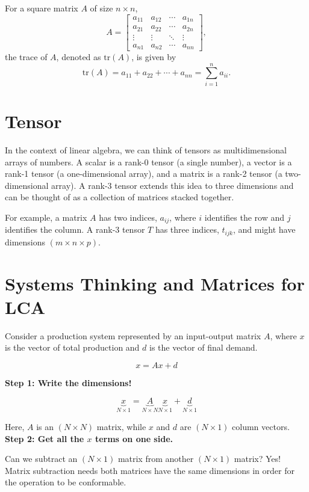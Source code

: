 \documentclass[12pt]{article}
\begin{document}
For a square matrix \( A \) of size \( n \times n \),
\[
A = \begin{bmatrix} a_{11} & a_{12} & \cdots & a_{1n} \\ a_{21} & a_{22} & \cdots & a_{2n} \\ \vdots & \vdots & \ddots & \vdots \\ a_{n1} & a_{n2} & \cdots & a_{nn} \end{bmatrix},
\]
the trace of \( A \), denoted as \( \text{tr}(A) \), is given by
\[
\text{tr}(A) = a_{11} + a_{22} + \cdots + a_{nn} = \sum_{i=1}^n a_{ii}.
\]

\section{Tensor}
In the context of linear algebra, we can think of tensors as multidimensional arrays of numbers. A scalar is a rank-0 tensor (a single number), a vector is a rank-1 tensor (a one-dimensional array), and a matrix is a rank-2 tensor (a two-dimensional array). A rank-3 tensor extends this idea to three dimensions and can be thought of as a collection of matrices stacked together.

For example, a matrix $A$ has two indices, $a_{ij}$, where $i$ identifies the row and $j$ identifies the column. A rank-3 tensor $T$ has three indices, $t_{ijk}$, and might have dimensions $(m \times n \times p)$.

\section{Systems Thinking and Matrices for LCA}

Consider a production system represented by an input-output matrix $A$, where $x$ is the vector of total production and $d$ is the vector of final demand.

\[
x = Ax + d
\]

\textbf{Step 1: Write the dimensions!}

\[
\underbrace{x}_{N \times 1}
=
\underbrace{A}_{N \times N}
\underbrace{x}_{N \times 1}
+
\underbrace{d}_{N \times 1}
\]

Here, $A$ is an $(N \times N)$ matrix, while $x$ and $d$ are $(N \times 1)$ column vectors.\\

\textbf{Step 2: Get all the $x$ terms on one side.}

Can we subtract an $(N \times 1)$ matrix from another $(N \times 1)$ matrix? Yes! Matrix subtraction needs both matrices have the same dimensions in order for the operation to be conformable.
\end{document}
